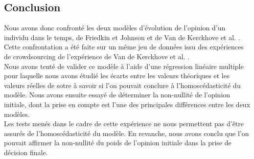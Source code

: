 \documentclass{scrreprt}
\begin{document}
\begin{multicols}{2}

\chapter{Conclusion}

Nous avons donc confronté les deux modèles d'évolution de l'opinion d'un individu dans le temps, de Friedkin et Johnson \cite{FJ} et de Van de Kerckhove et al. \cite{VMG}. Cette confrontation a été faite sur un même jeu de données issu des expériences de crowdsourcing de l'expérience de Van de Kerckhove et al. \cite{VMG}.\\

Nous avons tenté de valider ce modèle à l'aide d'une régression linéaire multiple pour laquelle nous avons étudié les écarts entre les valeurs théoriques et les valeurs réelles de sotre à savoir si l'on pouvait conclure à l'homoscédasticité du modèle. Nous avons ensuite essayé de déterminer la non-nullité de l'opinion initiale, dont la prise en compte est l'une des principales différences entre les deux modèles.\\

Les tests menés dans le cadre de cette expérience ne nous permettent pas d'être assurés de l'homoscédasticité du modèle. En revanche, nous avons conclu que l'on pouvait affirmer la non-nullité du poids de l'opinion initiale dans la prise de décision finale. \\


\end{multicols}



\end{document}
